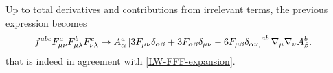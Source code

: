 Up to total derivatives and contributions from irrelevant terms, the previous expression becomes
\begin{align}
f^{abc} F_{\mu\nu}^a F_{\mu\lambda}^b F_{\nu\lambda}^c
& 
\rightarrow
A_{\alpha}^a
	\left[
		3 F_{ \mu \nu } \delta_{ \alpha \beta }  
		+  3 F_{ \alpha \beta} \delta_{ \mu \nu } 
		- 6 F_{ \mu \beta }\delta_{ \alpha \nu } 
	\right]^{ a b }
	 { \mathcal{\nabla} }_{ \mu } { \mathcal{\nabla} }_{ \nu } A_{\beta}^b.
\end{align}
that is indeed in agreement with \eqref{LW-FFF-expansion}.




